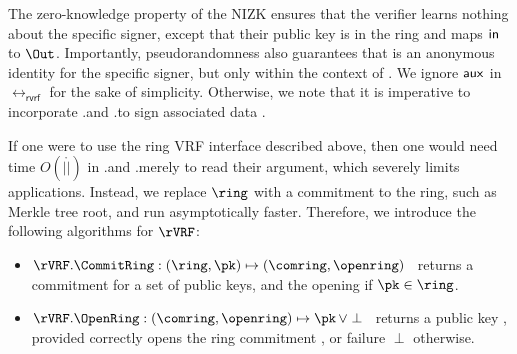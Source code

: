 

The zero-knowledge property of the NIZK ensures that the verifier learns nothing about the specific
signer, except that their public key is in the ring and maps $\mathsf{in}$ to $\Out$.
Importantly, pseudorandomness also guarantees that \Out is an anonymous identity
for the specific signer, but only within the context of \msg.  We ignore $ \mathsf{aux} $ in $ \rel_{\mathsf{rvrf}} $ for the sake of simplicity. Otherwise, we note that it is imperative to incorporate \rVRF.\Sign and \rVRF.\Verify to sign associated data \aux. 





If one were to use the ring VRF interface described above, then one would need time
$O(|\ring|)$ in \rVRF.\rSign and \rVRF.\rVerify merely to read their \ring
argument, which severely limits applications.
Instead, we replace $ \ring $ with a commitment to the ring, such as Merkle tree root, and run asymptotically faster. Therefore, we introduce the following algorithms for $ \rVRF $:
\begin{itemize}
\item $\rVRF.\CommitRing : (\ring,\pk) \mapsto (\comring,\openring)$ \,
    returns a commitment for a set \ring of public keys, and
     the opening \openring if $\pk \in \ring$.
\item $\rVRF.\OpenRing : (\comring,\openring) \mapsto \pk \, \lor \perp$ \,
    returns a public key \pk, provided \openring correctly opens
    the ring commitment \comring, or failure $\perp$ otherwise.
\end{itemize}

